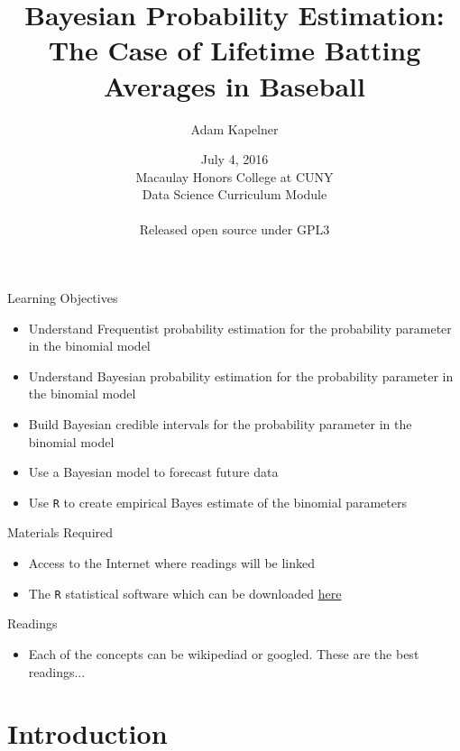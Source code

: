 \documentclass[slides]{beamer} %
\title[Bayesian Prob]{Bayesian Probability Estimation: The Case of Lifetime Batting Averages in Baseball}
\institute[Queens College, CUNY]{Department of Mathematics, Queens College, CUNY}
\date{July 4, 2016 \\ Macaulay Honors College at CUNY \\ Data Science Curriculum Module \\~\\
Released open source under GPL3}
\author{Adam Kapelner}
\begin{document}
\frame{\titlepage}


\begin{frame}
	\frametitle{}
\scriptsize
Learning Objectives
\begin{itemize}
\item Understand Frequentist probability estimation for the probability parameter in the binomial model
\item Understand Bayesian probability estimation for the probability parameter in the binomial model
\item Build Bayesian credible intervals for the probability parameter in the binomial model
\item Use a Bayesian model to forecast future data
\item Use \texttt{R} to create empirical Bayes estimate of the binomial parameters
\end{itemize}

Materials Required
\begin{itemize}
\item Access to the Internet where readings will be linked
\item The \texttt{R} statistical software which can be downloaded \href{http://cran.com}{here}
\end{itemize}

Readings
\begin{itemize}
\item Each of the concepts can be wikipediad or googled. These are the best readings...
\end{itemize}

\end{frame}

\section{Introduction}
\end{document}
